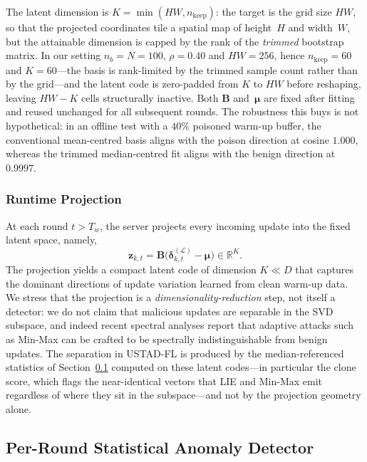 \documentclass[journal]{IEEEtran}
\begin{document}
The latent dimension is $K = \min(HW, n_{\mathrm{keep}})$: the target is the grid size $HW$, so that the projected coordinates tile a spatial map of height~$H$ and width~$W$, but the attainable dimension is capped by the rank of the \emph{trimmed} bootstrap matrix. In our setting $n_b = N = 100$, $\rho = 0.40$ and $HW = 256$, hence $n_{\mathrm{keep}} = 60$ and $K = 60$---the basis is rank-limited by the trimmed sample count rather than by the grid---and the latent code is zero-padded from $K$ to $HW$ before reshaping, leaving $HW - K$ cells structurally inactive. Both $\mathbf{B}$ and~$\boldsymbol{\mu}$ are fixed after fitting and reused unchanged for all subsequent rounds. The robustness this buys is not hypothetical: in an offline test with a $40\%$ poisoned warm-up buffer, the conventional mean-centred basis aligns with the poison direction at cosine $1.000$, whereas the trimmed median-centred fit aligns with the benign direction at $0.9997$.

\subsubsection{Runtime Projection}
At each round $t > T_w$, the server projects every incoming update into the fixed latent space, namely,
\begin{equation}
\mathbf{z}_{k,t} = \mathbf{B}\bigl(\boldsymbol{\delta}_{k,t}^{(\mathcal{L})} - \boldsymbol{\mu}\bigr) \in \mathbb{R}^K.
\label{eq:projection}
\end{equation}
The projection yields a compact latent code of dimension $K \ll D$ that captures the dominant directions of update variation learned from clean warm-up data. We stress that the projection is a \emph{dimensionality-reduction} step, not itself a detector: we do not claim that malicious updates are separable in the SVD subspace, and indeed recent spectral analyses report that adaptive attacks such as Min-Max can be crafted to be spectrally indistinguishable from benign updates. The separation in USTAD-FL is produced by the median-referenced statistics of Section~\ref{sec:stat_detector} computed on these latent codes---in particular the clone score, which flags the near-identical vectors that LIE and Min-Max emit regardless of where they sit in the subspace---and not by the projection geometry alone.

\subsection{Per-Round Statistical Anomaly Detector}
\label{sec:stat_detector}
\end{document}
